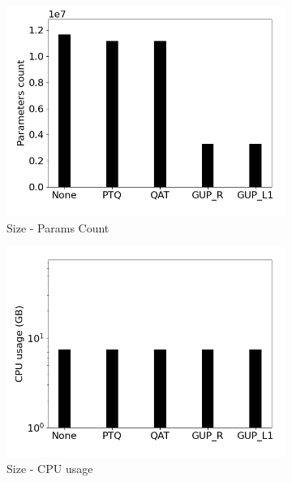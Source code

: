 \begin{figure}[]
\begin{subfigure}{0.19\textwidth}
        \includegraphics[width=1\textwidth]{other/figures/Resnet18_ImageNet1k_PC/Parameters_count.png}
        \caption{Size - Params Count}
    \end{subfigure}
    \begin{subfigure}{0.19\textwidth}
        \includegraphics[width=1\textwidth]{other/figures/Resnet18_ImageNet1k_PC/CPU_usage.png}
        \caption{Size - CPU usage}
    \end{subfigure}
    \begin{subfigure}{0.19\textwidth}

\end{subfigure}
\end{figure}
